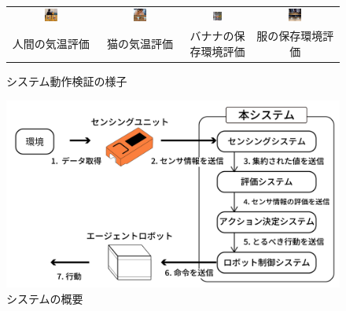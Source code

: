 \documentclass[paper=a4paper,jafontsize=9pt,head_space=15mm,gutter=20mm,
twocolumn,number_of_lines=49, line_length=26zw]{myuarticle}
\begin{document}
\setcounter{figure}{3}
\begin{figure}[t]
  \centering
  \begin{tabular}{cccc}
    \includegraphics[width=0.16\textwidth]{resources/human.png} &
    \includegraphics[width=0.16\textwidth]{resources/cat.png} &
    \includegraphics[width=0.16\textwidth]{resources/banana.png} &
    \includegraphics[width=0.16\textwidth]{resources/clothes.png} \\
    人間の気温評価 & 猫の気温評価 & バナナの保存環境評価 & 服の保存環境評価
  \end{tabular}
  \caption{システム動作検証の様子}
  \label{fig:system-test}
\end{figure}

\setcounter{figure}{1}
\begin{figure}[h]
  \centering
  \includegraphics[keepaspectratio,width=1.0\columnwidth]{resources/system_structure.png}
  \caption{システムの概要}
  \label{fig:system-structure}
\end{figure}
\end{document}
